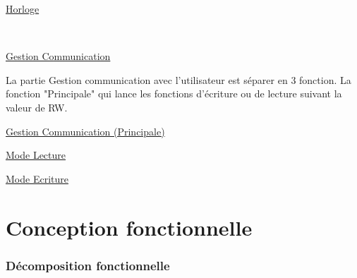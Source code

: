 \documentclass[11pt,french]{article} %
\begin{document}
\vspace{0.2in}
\underline{Horloge}

\begin{minipage}[t, h]{8cm}

\end{minipage}
~
\begin{minipage}[t, h]{8cm}

\end{minipage}


\underline{Gestion Communication}
\vspace{0.2in}

La partie Gestion communication avec l'utilisateur est séparer en 3 fonction. La fonction "Principale" qui lance les fonctions d'écriture ou de lecture suivant la valeur de RW.

%
%

\vspace{0.2in}
\hspace{0.2in}
\underline{Gestion Communication (Principale)}

\begin{center}

\end{center}

\pagebreak
\begin{landscape}

\hspace{0.2in}
\underline{Mode Lecture}

\hspace{-0.7in}


\vspace{0.5in}

\hspace{0.2in}
\underline{Mode Ecriture}

\hspace{-0.7in}


\end{landscape}

\part{Conception fonctionnelle}
\section{Décomposition fonctionnelle}

\begin{center}
\begin{turn}{90}

\end{turn}
\end{center}
\end{document}
